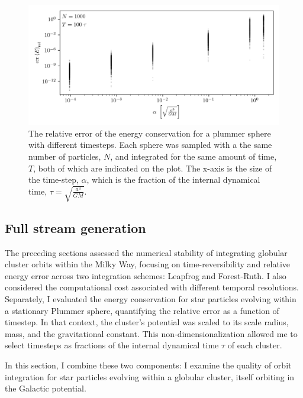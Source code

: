        \begin{figure}
            \centering
            \includegraphics[width=\linewidth]{images/numericalErrorStaticPlummerSphereEnergyError.png}
            \caption{The relative error of the energy conservation for a plummer sphere with different timesteps. Each sphere was sampled with a the same number of particles, $N$, and integrated for the same amount of time, $T$, both of which are indicated on the plot. The x-axis is the size of the time-step, $\alpha$, which is the fraction of the internal dynamical time, $\tau = \sqrt{\frac{a^3}{GM}}$. }
            \label{fig:numericalErrorStaticPlummerSphereEnergyError}
        \end{figure}

    \subsection{Full stream generation}
        The preceding sections assessed the numerical stability of integrating globular cluster orbits within the Milky Way, focusing on time-reversibility and relative energy error across two integration schemes: Leapfrog and Forest-Ruth. I also considered the computational cost associated with different temporal resolutions. Separately, I evaluated the energy conservation for star particles evolving within a stationary Plummer sphere, quantifying the relative error as a function of timestep. In that context, the cluster's potential was scaled to its scale radius, mass, and the gravitational constant. This non-dimensionalization allowed me to select timesteps as fractions of the internal dynamical time $\tau$ of each cluster. 

        In this section, I combine these two components: I examine the quality of orbit integration for star particles evolving within a globular cluster, itself orbiting in the Galactic potential.


